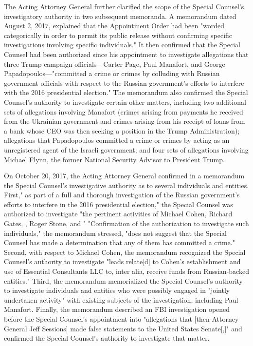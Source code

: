 The Acting Attorney General further clarified the scope of the Special Counsel's investigatory authority in two subsequent memoranda.
A memorandum dated August 2, 2017, explained that the Appointment Order had been "worded categorically in order to permit its public release without confirming specific investigations involving specific individuals."
It then confirmed that the Special Counsel had been authorized since his appointment to investigate allegations that three Trump campaign officials---Carter Page, Paul Manafort, and George Papadopoulos---"committed a crime or crimes by colluding with Russian government officials with respect to the Russian government's efforts to interfere with the 2016 presidential election."
The memorandum also confirmed the Special Counsel's authority to investigate certain other matters, including two additional sets of allegations involving Manafort (crimes arising from payments he received from the Ukrainian government and crimes arising from his receipt of loans from a bank whose CEO was then seeking a position in the Trump Administration); allegations that Papadopoulos committed a crime or crimes by acting as an unregistered agent of the Israeli government; and four sets of allegations involving Michael Flynn, the former National Security Advisor to President Trump.

On October 20, 2017, the Acting Attorney General confirmed in a memorandum the Special Counsel's investigative authority as to several individuals and entities.
First," as part of a full and thorough investigation of the Russian government's efforts to interfere in the 2016 presidential election," the Special Counsel was authorized to investigate "the pertinent activities of Michael Cohen, Richard Gates, , Roger Stone, and " "Confirmation of the authorization to investigate such individuals," the memorandum stressed, "does not suggest that the Special Counsel has made a determination that any of them has committed a crime."
Second, with respect to Michael Cohen, the memorandum recognized the Special Counsel's authority to investigate "leads relate[d] to Cohen's establishment and use of Essential Consultants LLC to, inter alia, receive funds from Russian-backed entities."
Third, the memorandum memorialized the Special Counsel's authority to investigate individuals and entities who were possibly engaged in "jointly undertaken activity" with existing subjects of the investigation, including Paul Manafort.
Finally, the memorandum described an FBI investigation opened before the Special Counsel's appointment into "allegations that [then-Attorney General Jeff Sessions] made false statements to the United States Senate[,]" and confirmed the Special Counsel's authority to investigate that matter.

